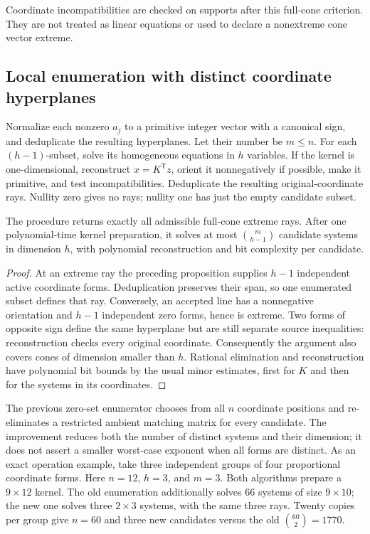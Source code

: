 Coordinate incompatibilities are checked on supports after this full-cone
criterion.  They are not treated as linear equations or used to declare a
nonextreme cone vector extreme.

\subsection{Local enumeration with distinct coordinate hyperplanes}

Normalize each nonzero $a_j$ to a primitive integer vector with a canonical
sign, and deduplicate the resulting hyperplanes.  Let their number be $m\leq n$.
For each $(h-1)$-subset, solve its homogeneous equations in $h$ variables.
If the kernel is one-dimensional, reconstruct $x=K^{\mathsf T}z$, orient it
nonnegatively if possible, make it primitive, and test incompatibilities.
Deduplicate the resulting original-coordinate rays.  Nullity zero gives no
rays; nullity one has just the empty candidate subset.

\begin{proposition}
The procedure returns exactly all admissible full-cone extreme rays.  After
one polynomial-time kernel preparation, it solves at most
$\binom{m}{h-1}$ candidate systems in dimension $h$, with polynomial
reconstruction and bit complexity per candidate.
\end{proposition}
\begin{proof}
At an extreme ray the preceding proposition supplies $h-1$ independent active
coordinate forms.  Deduplication preserves their span, so one enumerated
subset defines that ray.  Conversely, an accepted line has a nonnegative
orientation and $h-1$ independent zero forms, hence is extreme.  Two forms
of opposite sign define the same hyperplane but are still separate source
inequalities: reconstruction checks every original coordinate.  Consequently
the argument also covers cones of dimension smaller than $h$.  Rational
elimination and reconstruction have polynomial bit bounds by the usual
minor estimates, first for $K$ and then for the systems in its coordinates.
\end{proof}

The previous zero-set enumerator chooses from all $n$ coordinate positions
and re-eliminates a restricted ambient matching matrix for every candidate.
The improvement reduces both the number of distinct systems and their
dimension; it does not assert a smaller worst-case exponent when all forms
are distinct.  As an exact operation example, take three independent groups
of four proportional coordinate forms.  Here $n=12$, $h=3$, and $m=3$.  Both algorithms
prepare a $9\times12$ kernel.  The old enumeration additionally solves
$66$ systems of size $9\times10$; the new one solves three $2\times3$
systems, with the same three rays.  Twenty copies per group give $n=60$
and three new candidates versus the old $\binom{60}{2}=1770$.

